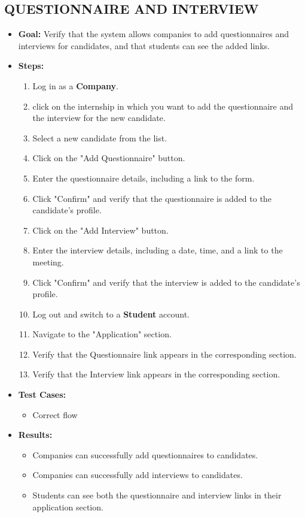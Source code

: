 \subsection{QUESTIONNAIRE AND INTERVIEW}\label{subsec:questionnaire-and-interview}
\begin{itemize}
    \item \textbf{Goal:} Verify that the system allows companies to add questionnaires and interviews for candidates, and that students can see the added links.

    \item \textbf{Steps:}
    \begin{enumerate}
        \item Log in as a \textbf{Company}.
        \item click on the internship in which you want to add the questionnaire and the interview for the new candidate.
        \item Select a new candidate from the list.
        \item Click on the "Add Questionnaire" button.
        \item Enter the questionnaire details, including a link to the form.
        \item Click "Confirm" and verify that the questionnaire is added to the candidate’s profile.
        \item Click on the "Add Interview" button.
        \item Enter the interview details, including a date, time, and a link to the meeting.
        \item Click "Confirm" and verify that the interview is added to the candidate’s profile.
        \item Log out and switch to a \textbf{Student} account.
        \item Navigate to the "Application" section.
        \item Verify that the Questionnaire link appears in the corresponding section.
        \item Verify that the Interview link appears in the corresponding section.
    \end{enumerate}

    \item \textbf{Test Cases:}
    \begin{itemize}
        \item Correct flow
    \end{itemize}

    \item \textbf{Results:}
    \begin{itemize}
        \item Companies can successfully add questionnaires to candidates.
        \item Companies can successfully add interviews to candidates.
        \item Students can see both the questionnaire and interview links in their application section.
    \end{itemize}
\end{itemize}


